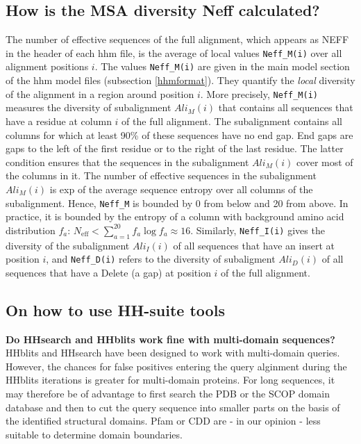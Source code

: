 \documentclass[11pt,a4paper]{article}
\begin{document}
\subsection{How is the MSA diversity Neff calculated?} \label{Neff}
The number of effective sequences of the full alignment, which appears as NEFF in the header of each hhm file, is the average of local values \verb`Neff_M(i)` over all alignment positions $i$. The values \verb`Neff_M(i)` are given in the main model section of the hhm model files (subsection \ref{hhmformat}). They quantify the \emph{local} diversity of the alignment in a region around position $i$. More precisely, \verb`Neff_M(i)` measures the diversity of subalignment $Ali_M(i)$ that contains all sequences that have a residue at column $i$ of the full alignment. The subalignment contains all columns for which at least 90\% of these sequences have no end gap. End gaps are gaps to the left of the first residue or to the right of the last residue. The latter condition ensures that the sequences in the subalignment $Ali_M(i)$ cover most of the columns in it. The number of effective sequences in the subalignment $Ali_M(i)$ is exp of the average sequence entropy over all columns of the subalignment. Hence, \verb`Neff_M` is bounded by 0 from below and 20 from above. In practice, it is bounded by the entropy of a column with background amino acid distribution $f_a$: $N_\mathrm{eff} < \sum_{a=1}^{20} f_a \log f_a \approx 16$. Similarly, \verb`Neff_I(i)` gives the diversity of the subalignment $Ali_I(i)$ of all sequences that have an insert at position $i$, and \verb`Neff_D(i)` refers to the diversity of subaligment $Ali_D(i)$ of all sequences that have a Delete (a gap) at position $i$ of the full alignment. 



\subsection{On how to use HH-suite tools}

{\bf Do HHsearch and HHblits work fine with multi-domain sequences?}
HHblits and HHsearch have been designed to work with multi-domain queries. However, the chances for false positives entering the query alginment during the HHblits iterations is greater for multi-domain proteins. For long sequences, it may therefore be of advantage to first search the PDB or the SCOP domain database and then to cut the query sequence into smaller parts on the basis of the identified structural domains. Pfam or CDD are - in our opinion - less suitable to determine domain boundaries.
\end{document}
